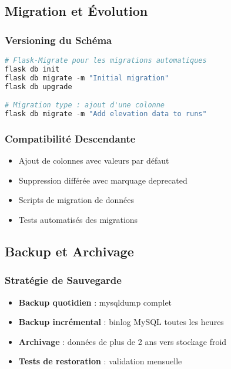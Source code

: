 \subsection{Migration et Évolution}

\subsubsection{Versioning du Schéma}

\begin{lstlisting}[language=python]
# Flask-Migrate pour les migrations automatiques
flask db init
flask db migrate -m "Initial migration"
flask db upgrade

# Migration type : ajout d'une colonne
flask db migrate -m "Add elevation data to runs"
\end{lstlisting}

\subsubsection{Compatibilité Descendante}

\begin{itemize}
    \item Ajout de colonnes avec valeurs par défaut
    \item Suppression différée avec marquage deprecated
    \item Scripts de migration de données
    \item Tests automatisés des migrations
\end{itemize}

\subsection{Backup et Archivage}

\subsubsection{Stratégie de Sauvegarde}

\begin{itemize}
    \item \textbf{Backup quotidien} : mysqldump complet
    \item \textbf{Backup incrémental} : binlog MySQL toutes les heures  
    \item \textbf{Archivage} : données de plus de 2 ans vers stockage froid
    \item \textbf{Tests de restoration} : validation mensuelle
\end{itemize}

